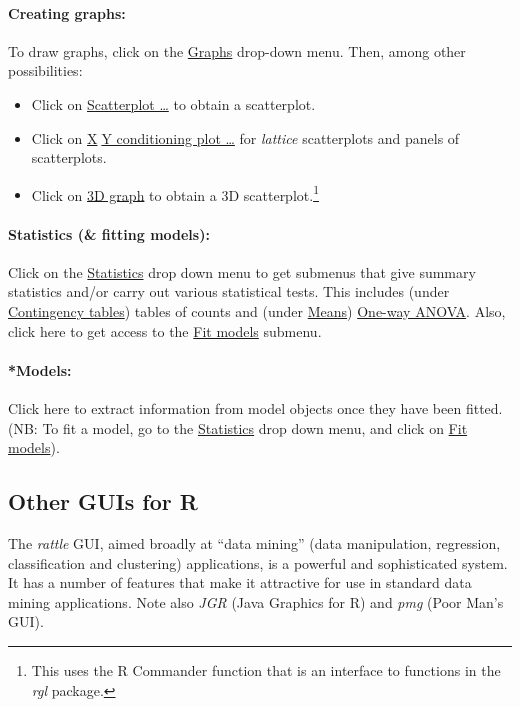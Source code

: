 \paragraph{Creating graphs:}
To draw graphs, click on the \underline{Graphs} drop-down menu. Then,
among other possibilities:
\begin{itemize}
\item Click on \underline{Scatterplot \ldots} to obtain a
  scatterplot.
\item Click on \underline{X$\;$Y conditioning plot \ldots}
for {\em lattice} scatterplots and panels of scatterplots.
\item Click on \underline{3D graph} to obtain a 3D
scatterplot.\footnote{This uses
  the R Commander function  that is an interface
  to functions in the \textit{rgl} package.}
\end{itemize}

\paragraph{Statistics (\& fitting models):} Click on the
\underline{Statistics} drop down menu to get submenus that give
summary statistics and/or carry out various statistical tests.  This
includes (under \underline{Contingency tables}) tables of counts
and (under \underline{Means}) \underline{One-way ANOVA}.
Also, click here to get access to the \underline{Fit models} submenu.

\paragraph{*Models:} Click here to extract information from model
objects once they have been fitted.  (NB: To fit a model, go to the
\underline{Statistics} drop down menu, and click on \underline{Fit
  models}).

\subsection*{Other GUIs for R}

The {\em rattle} GUI, aimed broadly at ``data mining'' (data
manipulation, regression, classification and clustering) applications,
is a powerful and sophisticated system.  It has a number of features
that make it attractive for use in standard data mining applications.
Note also \textit{JGR} (Java Graphics for R) and \textit{pmg} (Poor
Man's GUI).


